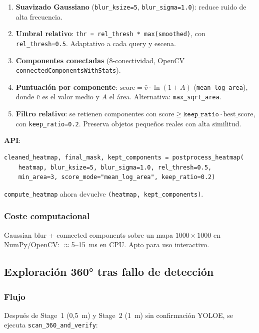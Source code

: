\documentclass[11pt,a4paper]{article}
\begin{document}
\begin{enumerate}
  \item \textbf{Suavizado Gaussiano} (\texttt{blur\_ksize=5},
        \texttt{blur\_sigma=1.0}): reduce ruido de alta frecuencia.
  \item \textbf{Umbral relativo}: \texttt{thr = rel\_thresh * max(smoothed)},
        con \texttt{rel\_thresh=0.5}. Adaptativo a cada query y escena.
  \item \textbf{Componentes conectadas} (8-conectividad, OpenCV
        \texttt{connectedComponentsWithStats}).
  \item \textbf{Puntuación por componente}:
        $\text{score} = \bar{v} \cdot \ln(1+A)$
        (\texttt{mean\_log\_area}), donde $\bar{v}$ es el valor medio y $A$
        el área. Alternativa: \texttt{max\_sqrt\_area}.
  \item \textbf{Filtro relativo}: se retienen componentes con
        $\text{score} \geq \texttt{keep\_ratio} \cdot \text{best\_score}$,
        con \texttt{keep\_ratio=0.2}. Preserva objetos pequeños reales con
        alta similitud.
\end{enumerate}

\textbf{API}:
\begin{verbatim}
cleaned_heatmap, final_mask, kept_components = postprocess_heatmap(
    heatmap, blur_ksize=5, blur_sigma=1.0, rel_thresh=0.5,
    min_area=3, score_mode="mean_log_area", keep_ratio=0.2)
\end{verbatim}

\texttt{compute\_heatmap} ahora devuelve
\texttt{(heatmap, kept\_components)}.

\subsubsection*{Coste computacional}
Gaussian blur + connected components sobre un mapa $1000\times1000$ en
NumPy/OpenCV: $\approx$5--15~ms en CPU. Apto para uso interactivo.

\subsection{Exploración 360° tras fallo de detección}

\subsubsection*{Flujo}
Después de Stage~1 (0{,}5~m) y Stage~2 (1~m) sin confirmación YOLOE, se
ejecuta \texttt{scan\_360\_and\_verify}:
\end{document}
